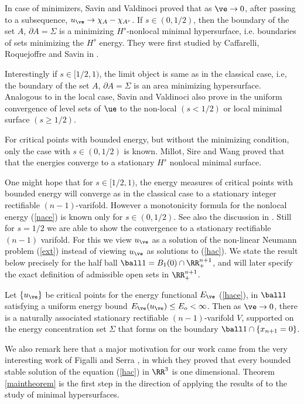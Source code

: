 In case of minimizers, Savin and Valdinoci \cite{sv} proved that as $\ve \to 0$, after passing to a subsequence, $u_\ve \to \chi_A - \chi_{A^c}$. If $s\in(0,1/2)$, then the boundary of the set $A$, $\partial A = \Sigma$ is a minimizing  $H^s$-nonlocal minimal hypersurface, i.e. boundaries of sets minimizing the $H^s$ energy. They were first studied by Caffarelli, Roquejoffre and Savin in \cite{crs}.
    
Interestingly if $s\in[1/2,1)$, the limit object is same as in the classical case, i.e, the boundary of the set $A$, $\partial A = \Sigma$ is an area minimizing hypersurface. Analogous to \cite{cc} in the local case, Savin and Valdinoci also prove in \cite{sv1} the uniform convergence of level sets of $\ue$ to the non-local $(s<1/2)$  or local minimal surface $(s\geq1/2)$.
    
For critical points with bounded energy, but without the minimizing condition, only the case with $s\in (0,1/2)$ is known. Millot, Sire and Wang \cite{msw} proved that that the energies converge to a  stationary $H^s$ nonlocal minimal surface. 

One might hope that for $s \in [1/2,1)$, the energy measures of critical points with bounded energy will converge as in the classical case \cite{ht} to a stationary integer rectifiable $(n-1)$-varifold. However a monotonicity formula for the nonlocal energy (\ref{nace}) is known only for $s\in(0,1/2)$. See also the discussion in \cite{csv}. Still for $s=1/2$ we are able to show the convergence to a stationary rectifiable $(n-1)$ varifold. For this we view $u_{\ve}$ as a solution of the non-linear Neumann problem (\ref{ext}) instead of viewing $u_\ve$ as solutions to (\ref{hac}). We state the result below precisely for the half ball $\ball 1 = B_1(0) \cap \RR^{n+1}_+$, and will later specify the exact definition of admissible open sets in $\RR^{n+1}_+$.
\begin{theo} \label{maintheorem}
Let $\{u_\ve \}$ be critical points for the energy functional $E_\ve$ (\ref{hace}), in $\ball 1$ satisfying a uniform energy bound $E_{\ve}(u_\ve) \leq E_o < \infty$.  Then as $\ve \to 0$, there is a naturally associated stationary rectifiable $(n-1)$-varifold $V$, supported on the energy concentration set $\Sigma$ that forms on the boundary $\ball 1 \cap \{x_{n+1}=0 \}$.
\end{theo}

We also remark here that a major motivation for our work came from the very interesting work of Figalli and Serra \cite{fs}, in which they proved that every bounded stable solution of the equation  (\ref{hac}) in $\RR^3$ is one dimensional. Theorem \ref{maintheorem} is the first step in the direction of applying the results of \cite{fs} to the study of minimal hypersurfaces. 

